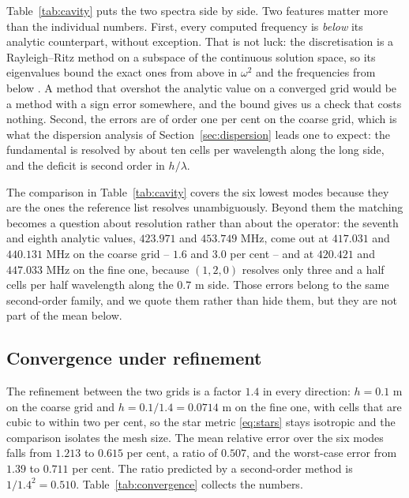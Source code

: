 Table~\ref{tab:cavity} puts the two spectra side by side. Two features matter more than the
individual numbers. First, every computed frequency is \emph{below} its analytic counterpart,
without exception. That is not luck: the discretisation is a Rayleigh--Ritz method on a subspace of
the continuous solution space, so its eigenvalues bound the exact ones from above in $\omega^{2}$
and the frequencies from below \cite{bossavit1998,jin2014}. A method that overshot the analytic
value on a converged grid would be a method with a sign error somewhere, and the bound gives us a
check that costs nothing. Second, the errors are of order one per cent on the coarse grid, which is
what the dispersion analysis of Section~\ref{sec:dispersion} leads one to expect: the fundamental is
resolved by about ten cells per wavelength along the long side, and the deficit is second order in
$h/\lambda$.

The comparison in Table~\ref{tab:cavity} covers the six lowest modes because they are the ones the
reference list resolves unambiguously. Beyond them the matching becomes a question about resolution
rather than about the operator: the seventh and eighth analytic values, $423.971$ and $453.749$ MHz,
come out at $417.031$ and $440.131$ MHz on the coarse grid -- $1.6$ and $3.0$ per cent -- and at
$420.421$ and $447.033$ MHz on the fine one, because $(1,2,0)$ resolves only three and a half cells
per half wavelength along the $0.7$ m side. Those errors belong to the same second-order family, and
we quote them rather than hide them, but they are not part of the mean below.

\subsection{Convergence under refinement}

The refinement between the two grids is a factor $1.4$ in every direction: $h=0.1$ m on the coarse
grid and $h=0.1/1.4=0.0714$ m on the fine one, with cells that are cubic to within two per cent, so
the star metric \eqref{eq:stars} stays isotropic and the comparison isolates the mesh size. The mean
relative error over the six modes falls from $1.213$ to $0.615$ per cent, a ratio of $0.507$, and
the worst-case error from $1.39$ to $0.711$ per cent. The ratio predicted by a second-order method
is $1/1.4^{2}=0.510$. Table~\ref{tab:convergence} collects the numbers.

